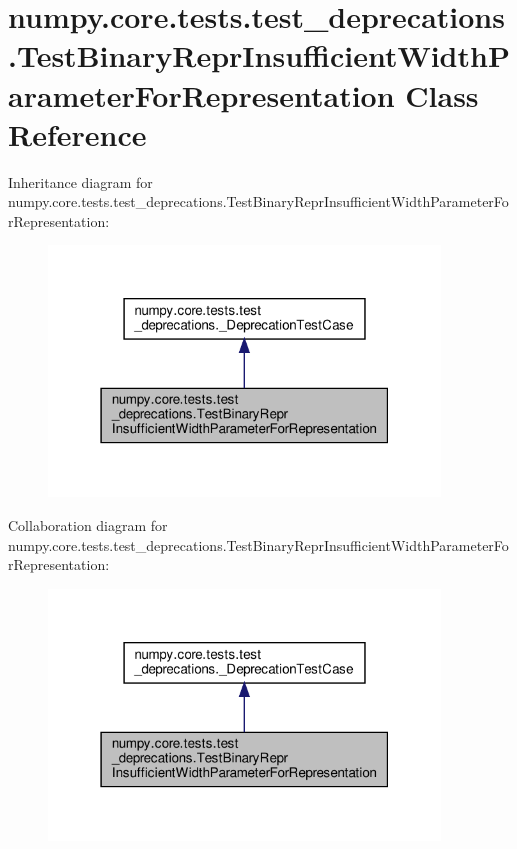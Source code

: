\hypertarget{classnumpy_1_1core_1_1tests_1_1test__deprecations_1_1TestBinaryReprInsufficientWidthParameterForRepresentation}{}\section{numpy.\+core.\+tests.\+test\+\_\+deprecations.\+Test\+Binary\+Repr\+Insufficient\+Width\+Parameter\+For\+Representation Class Reference}
\label{classnumpy_1_1core_1_1tests_1_1test__deprecations_1_1TestBinaryReprInsufficientWidthParameterForRepresentation}


Inheritance diagram for numpy.\+core.\+tests.\+test\+\_\+deprecations.\+Test\+Binary\+Repr\+Insufficient\+Width\+Parameter\+For\+Representation\+:
\nopagebreak
\begin{figure}[H]
\begin{center}
\leavevmode
\includegraphics[width=295pt]{classnumpy_1_1core_1_1tests_1_1test__deprecations_1_1TestBinaryReprInsufficientWidthParameterForRepresentation__inherit__graph}
\end{center}
\end{figure}


Collaboration diagram for numpy.\+core.\+tests.\+test\+\_\+deprecations.\+Test\+Binary\+Repr\+Insufficient\+Width\+Parameter\+For\+Representation\+:
\nopagebreak
\begin{figure}[H]
\begin{center}
\leavevmode
\includegraphics[width=295pt]{classnumpy_1_1core_1_1tests_1_1test__deprecations_1_1TestBinaryReprInsufficientWidthParameterForRepresentation__coll__graph}
\end{center}
\end{figure}
